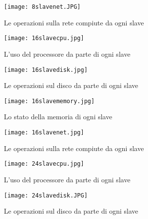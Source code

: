 \begin{figure}
  \begin{center}
    \texttt{[image: 8slavenet.JPG]}
    \caption{Le operazioni sulla rete compiute da ogni slave}
    \label{fig:8slavenet.JPG}
  \end{center}
\end{figure}

\begin{figure}
  \begin{center}
    \texttt{[image: 16slavecpu.jpg]}
    \caption{L'uso del processore da parte di ogni slave}
    \label{fig:16slavecpu.jpg}
  \end{center}
\end{figure}

\begin{figure}
  \begin{center}
    \texttt{[image: 16slavedisk.jpg]}
    \caption{Le operazioni sul disco da parte di ogni slave}
    \label{fig:16slavedisk.jpg}
  \end{center}
\end{figure}

\begin{figure}
  \begin{center}
    \texttt{[image: 16slavememory.jpg]}
    \caption{Lo stato della memoria di ogni slave}
    \label{fig:16slavememory.JPG}
  \end{center}
\end{figure}

\begin{figure}
  \begin{center}
    \texttt{[image: 16slavenet.jpg]}
    \caption{Le operazioni sulla rete compiute da ogni slave}
    \label{fig:16slavenet.JPG}
  \end{center}
\end{figure}

\begin{figure}
  \begin{center}
    \texttt{[image: 24slavecpu.jpg]}
    \caption{L'uso del processore da parte di ogni slave}
    \label{fig:24slavecpu.jpg}
  \end{center}
\end{figure}

\begin{figure}
  \begin{center}
    \texttt{[image: 24slavedisk.JPG]}
    \caption{Le operazioni sul disco da parte di ogni slave}
    \label{fig:24slavedisk.jpg}
  \end{center}
\end{figure}

